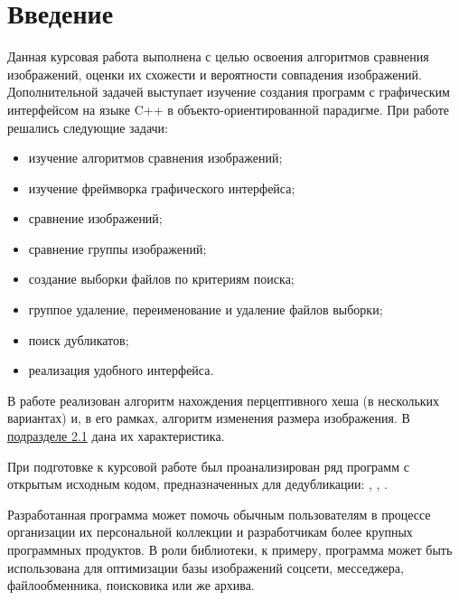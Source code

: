 \documentclass[variant=courcework]{bsuir}
\begin{document}



\tableofcontents

\chapter*{Введение}

Данная курсовая работа выполнена с целью освоения алгоритмов сравнения
изображений, оценки их схожести и вероятности совпадения изображений.
Дополнительной задачей выступает изучение создания программ с графическим
интерфейсом на языке C++ в объекто-ориентированной парадигме. При работе
решались следующие задачи:

\begin{itemize}
    \item изучение алгоритмов сравнения изображений;
    \item изучение фреймворка графического интерфейса;
    \item сравнение изображений;
    \item сравнение группы изображений;
    \item создание выборки файлов по критериям поиска;
    \item группое удаление, переименование и удаление файлов выборки;
    \item поиск дубликатов;
    \item реализация удобного интерфейса.
\end{itemize}

В работе реализован алгоритм нахождения перцептивного хеша (в нескольких
вариантах) и, в его рамках, алгоритм изменения размера изображения. В
\hyperref[sec:2.1]{подразделе 2.1} дана их характеристика.

При подготовке к курсовой работе был проанализирован ряд программ с открытым
исходным кодом, предназначенных для дедубликации: ,
, .

Разработанная программа может помочь обычным пользователям в процессе
организации их персональной коллекции и разработчикам более крупных программных
продуктов. В роли библиотеки, к примеру, программа может быть использована для
оптимизации базы изображений соцсети, месседжера, файлообменника, поисковика или
же архива.
\end{document}
